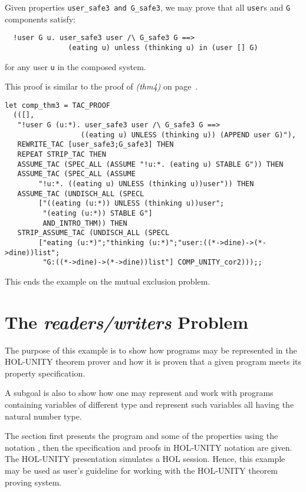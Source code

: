 \medskip
Given properties {\tt user\_safe3 and G\_safe3}, we may prove that all
{\tt user}s and {\tt G} components satisfy:

{\footnotesize 
\begin{verbatim}
  !user G u. user_safe3 user /\ G_safe3 G ==>
               (eating u) unless (thinking u) in (user [] G)
\end{verbatim}
}
for any user {\tt u} in the composed system.

\smallskip
This proof is similar to the proof of {\it (thm4)} on page~\pageref{thm4page}.

{\footnotesize 
\begin{verbatim}
let comp_thm3 = TAC_PROOF
  (([],
   "!user G (u:*). user_safe3 user /\ G_safe3 G ==>
                  ((eating u) UNLESS (thinking u)) (APPEND user G)"),
   REWRITE_TAC [user_safe3;G_safe3] THEN
   REPEAT STRIP_TAC THEN
   ASSUME_TAC (SPEC_ALL (ASSUME "!u:*. (eating u) STABLE G")) THEN
   ASSUME_TAC (SPEC_ALL (ASSUME
        "!u:*. ((eating u) UNLESS (thinking u))user")) THEN
   ASSUME_TAC (UNDISCH_ALL (SPECL
        ["((eating (u:*)) UNLESS (thinking u))user";
         "(eating (u:*)) STABLE G"]
         AND_INTRO_THM)) THEN
   STRIP_ASSUME_TAC (UNDISCH_ALL (SPECL
        ["eating (u:*)";"thinking (u:*)";"user:((*->dine)->(*->dine))list";
         "G:((*->dine)->(*->dine))list"] COMP_UNITY_cor2)));;
\end{verbatim}
}

This ends the example on the mutual exclusion problem.


\section{The {\it readers/writers} Problem} \label{sec:readwrite}

The purpose of this example is to show how programs may be represented in the
HOL-UNITY theorem prover and how it is proven that a given program meets its
property specification.

A subgoal is also to show how one may represent and work with programs
containing variables of different type and represent such variables all
having the natural number type.

The section first presents the program and some of the properties using the
notation \cite{CM88}, then the specification and proofs in HOL-UNITY notation
are given.  The HOL-UNITY presentation simulates a HOL session.  Hence, this 
example may be used as user's guideline for working with the HOL-UNITY theorem 
proving system.

